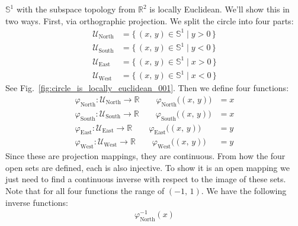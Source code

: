 \documentclass{article}
\theoremstyle{plain}
\theoremstyle{normal}
\newenvironment{example}{%
    \pushQED{\qed}\renewcommand{\qedsymbol}{$\blacksquare$}\examplex%
}{%
    \popQED\endexamplex%
}
\begin{document}
        \begin{example}
            $\mathbb{S}^{1}$ with the subspace topology from $\mathbb{R}^{2}$
            is locally Euclidean. We'll show this in two ways. First, via
            orthographic projection. We split the circle into four parts:
            \begin{align}
                \mathcal{U}_{\textrm{North}}
                &=\{\,(x,\,y)\in\mathbb{S}^{1}\;|\;y>0\,\}\\
                \mathcal{U}_{\textrm{South}}
                &=\{\,(x,\,y)\in\mathbb{S}^{1}\;|\;y<0\,\}\\
                \mathcal{U}_{\textrm{East}}
                &=\{\,(x,\,y)\in\mathbb{S}^{1}\;|\;x>0\,\}\\
                \mathcal{U}_{\textrm{West}}
                &=\{\,(x,\,y)\in\mathbb{S}^{1}\;|\;x<0\,\}
            \end{align}
            See Fig.~\ref{fig:circle_is_locally_euclidean_001}.
            Then we define four functions:
            \begin{align}
                \varphi_{\textrm{North}}:
                \mathcal{U}_{\textrm{North}}\rightarrow\mathbb{R}
                \quad\quad
                \varphi_{\textrm{North}}\big((x,\,y)\big)&=x\\
                \varphi_{\textrm{South}}:
                \mathcal{U}_{\textrm{South}}\rightarrow\mathbb{R}
                \quad\quad
                \varphi_{\textrm{South}}\big((x,\,y)\big)&=x\\
                \varphi_{\textrm{East}}:
                \mathcal{U}_{\textrm{East}}\rightarrow\mathbb{R}
                \quad\quad
                \varphi_{\textrm{East}}\big((x,\,y)\big)&=y\\
                \varphi_{\textrm{West}}:
                \mathcal{U}_{\textrm{West}}\rightarrow\mathbb{R}
                \quad\quad
                \varphi_{\textrm{West}}\big((x,\,y)\big)&=y
            \end{align}
            Since these are projection mappings, they are continuous. From
            how the four open sets are defined, each is also injective. To
            show it is an open mapping we just need to find a continuous
            inverse with respect to the image of these sets. Note that for all
            four functions the range of $(-1,\,1)$. We have the following
            inverse functions:
            \begin{align}
                \varphi_{\textrm{North}}^{-1}(x)

\end{align}
\end{example}
\end{document}
